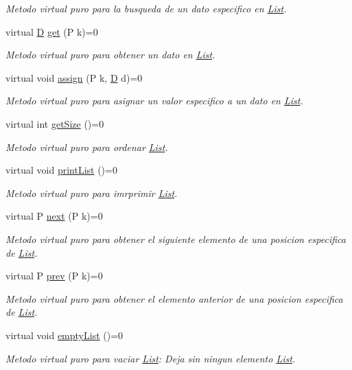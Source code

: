 \begin{DoxyCompactItemize}
\begin{DoxyCompactList}\small\item\em Metodo virtual puro para la busqueda de un dato especifico en \hyperlink{class_list}{List}. \end{DoxyCompactList}\item 
virtual \hyperlink{gwp_2main_8cpp_af316c33cc298530f245e8b55330e86b5}{D} \hyperlink{class_list_a5bd565e668247ae0691983227367cc88}{get} (P k)=0
\begin{DoxyCompactList}\small\item\em Metodo virtual puro para obtener un dato en \hyperlink{class_list}{List}. \end{DoxyCompactList}\item 
virtual void \hyperlink{class_list_acb062aa988f4048498b30a2d845a311b}{assign} (P k, \hyperlink{gwp_2main_8cpp_af316c33cc298530f245e8b55330e86b5}{D} d)=0
\begin{DoxyCompactList}\small\item\em Metodo virtual puro para asignar un valor especifico a un dato en \hyperlink{class_list}{List}. \end{DoxyCompactList}\item 
virtual int \hyperlink{class_list_af213bbcf13ee436a0f04cde66e337672}{get\+Size} ()=0
\begin{DoxyCompactList}\small\item\em Metodo virtual puro para ordenar \hyperlink{class_list}{List}. \end{DoxyCompactList}\item 
virtual void \hyperlink{class_list_a8b34931e187e7e6b86aad86510ce4f3b}{print\+List} ()=0
\begin{DoxyCompactList}\small\item\em Metodo virtual puro para imrprimir \hyperlink{class_list}{List}. \end{DoxyCompactList}\item 
virtual P \hyperlink{class_list_a4ec3e88e176bb45bc49b030d1c8abb3f}{next} (P k)=0
\begin{DoxyCompactList}\small\item\em Metodo virtual puro para obtener el siguiente elemento de una posicion especifica de \hyperlink{class_list}{List}. \end{DoxyCompactList}\item 
virtual P \hyperlink{class_list_acc1831ae92a288345ef20cb29f3846b2}{prev} (P k)=0
\begin{DoxyCompactList}\small\item\em Metodo virtual puro para obtener el elemento anterior de una posicion especifica de \hyperlink{class_list}{List}. \end{DoxyCompactList}\item 
virtual void \hyperlink{class_list_a24b4f177a70215980e81ef7b2981fa1e}{empty\+List} ()=0
\begin{DoxyCompactList}\small\item\em Metodo virtual puro para vaciar \hyperlink{class_list}{List}\+: Deja sin ningun elemento \hyperlink{class_list}{List}. \end{DoxyCompactList}\end{DoxyCompactItemize}
